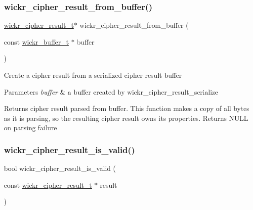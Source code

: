 \subsubsection{\texorpdfstring{wickr\+\_\+cipher\+\_\+result\+\_\+from\+\_\+buffer()}{wickr\_cipher\_result\_from\_buffer()}}
{\footnotesize\ttfamily \hyperlink{structwickr__cipher__result}{wickr\+\_\+cipher\+\_\+result\+\_\+t}$\ast$ wickr\+\_\+cipher\+\_\+result\+\_\+from\+\_\+buffer (\begin{DoxyParamCaption}\item[{const \hyperlink{structwickr__buffer}{wickr\+\_\+buffer\+\_\+t} $\ast$}]{buffer }\end{DoxyParamCaption})}

Create a cipher result from a serialized cipher result buffer


\begin{DoxyParams}{Parameters}
{\em buffer} & a buffer created by \textquotesingle{}wickr\+\_\+cipher\+\_\+result\+\_\+serialize\textquotesingle{} \\
\hline
\end{DoxyParams}
\begin{DoxyReturn}{Returns}
cipher result parsed from \textquotesingle{}buffer\textquotesingle{}. This function makes a copy of all bytes as it is parsing, so the resulting cipher result owns its properties. Returns N\+U\+LL on parsing failure 
\end{DoxyReturn}
\mbox{\label{group__wickr__cipher_ga3f1b679c199987148952816b6fc4c009}} 
\subsubsection{\texorpdfstring{wickr\+\_\+cipher\+\_\+result\+\_\+is\+\_\+valid()}{wickr\_cipher\_result\_is\_valid()}}
{\footnotesize\ttfamily bool wickr\+\_\+cipher\+\_\+result\+\_\+is\+\_\+valid (\begin{DoxyParamCaption}\item[{const \hyperlink{structwickr__cipher__result}{wickr\+\_\+cipher\+\_\+result\+\_\+t} $\ast$}]{result }\end{DoxyParamCaption})}

